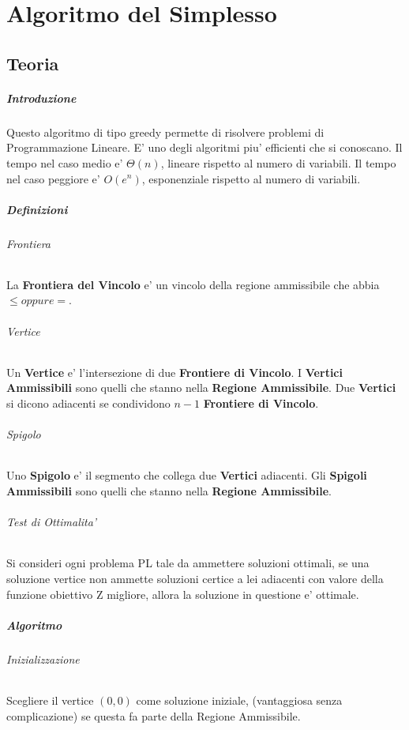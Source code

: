 \chapter{Algoritmo del Simplesso}

\section{Teoria}

\paragraph{Introduzione}

Questo algoritmo di tipo greedy permette di risolvere problemi di Programmazione Lineare.
E' uno degli algoritmi piu' efficienti che si conoscano.
Il tempo nel caso medio e' $\Theta(n)$, lineare rispetto al numero di variabili.
Il tempo nel caso peggiore e' $O(e^n)$, esponenziale rispetto al numero di variabili.

\paragraph{Definizioni}

\subparagraph{Frontiera}
La \textbf{Frontiera del Vincolo} e' un vincolo della regione ammissibile che abbia $\leq oppure =$.

\subparagraph{Vertice}
Un \textbf{Vertice} e' l'intersezione di due \textbf{Frontiere di Vincolo}.
I \textbf{Vertici Ammissibili} sono quelli che stanno nella \textbf{Regione Ammissibile}.
Due \textbf{Vertici} si dicono adiacenti se condividono $n-1$ \textbf{Frontiere di Vincolo}.

\subparagraph{Spigolo}
Uno \textbf{Spigolo} e' il segmento che collega due \textbf{Vertici} adiacenti.
Gli \textbf{Spigoli Ammissibili} sono quelli che stanno nella \textbf{Regione Ammissibile}.

\subparagraph{Test di Ottimalita'}
Si consideri ogni problema PL tale da ammettere soluzioni ottimali, se una soluzione vertice non ammette soluzioni certice a lei adiacenti con valore della funzione obiettivo Z migliore, allora la soluzione in questione e' ottimale.

\paragraph{Algoritmo}

\subparagraph{Inizializzazione}
Scegliere il vertice $(0,0)$ come soluzione iniziale, (vantaggiosa senza complicazione) se questa fa parte della Regione Ammissibile.

